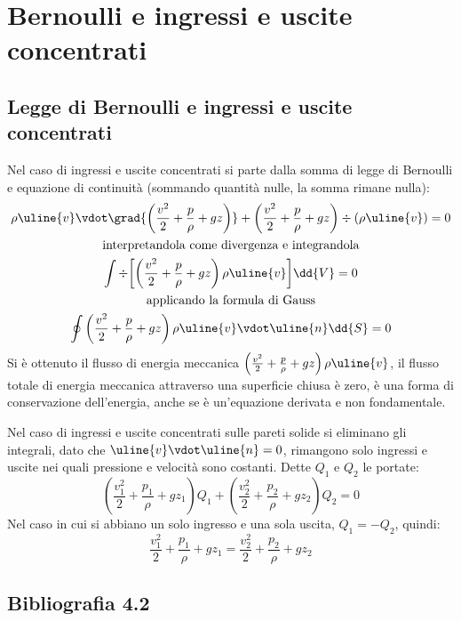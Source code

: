 %
\section{Bernoulli e ingressi e uscite concentrati}
\subsection{Legge di Bernoulli e ingressi e uscite concentrati}
Nel caso di ingressi e uscite concentrati si parte dalla somma di legge di Bernoulli e equazione di continuità (sommando quantità nulle, la somma rimane nulla):
%
	\begin{equation*}
		\begin{gathered}
			\rho \uline{v} \vdot \grad{\left( \frac{v^2}{2} + \frac{p}{\rho} + gz \right)} + \left(\frac{v^2}{2} + \frac{p}{\rho} + gz \right) \div{(\rho \uline{v})} = 0\\
			\text{interpretandola come divergenza e integrandola}\\
			\int \div{\left[ \left(\frac{v^2}{2} + \frac{p}{\rho} + gz \right) \rho \uline{v} \right]} \dd{V} = 0\\
			\text{applicando la formula di Gauss}\\
			\oint \left(\frac{v^2}{2} + \frac{p}{\rho} + gz \right) \rho \uline{v} \vdot \uline{n} \dd{S} = 0
		\end{gathered}
	\end{equation*}
%
Si è ottenuto il flusso di energia meccanica $\left(\frac{v^2}{2} + \frac{p}{\rho} + gz \right) \rho \uline{v}$, il flusso totale di energia meccanica attraverso una superficie chiusa è zero, è una forma di conservazione dell'energia, anche se è un'equazione derivata e non fondamentale.

Nel caso di ingressi e uscite concentrati sulle pareti solide si eliminano gli integrali, dato che $\uline{v} \vdot \uline{n} = 0$, rimangono solo ingressi e uscite nei quali pressione e velocità sono costanti.
Dette $Q_1$ e $Q_2$ le portate:
%
	\begin{equation*}
		\left( \frac{v_1^2}{2} + \frac{p_1}{\rho} + g z_1 \right) Q_1 + \left( \frac{v_2^2}{2} + \frac{p_2}{\rho} + g z_2 \right) Q_2 = 0
	\end{equation*}
%
Nel caso in cui si abbiano un solo ingresso e una sola uscita, $Q_1 = - Q_2$, quindi:
%
	\begin{equation*}
		\frac{v_1^2}{2} + \frac{p_1}{\rho} + g z_1 =  \frac{v_2^2}{2} + \frac{p_2}{\rho} + g z_2 
	\end{equation*}
% 
\subsection*{Bibliografia 4.2}
\cite[Cap.\ 5.5]{CengelCimbala}\\
\cite[Cap.\ 7.1]{PnueliGutfinger}